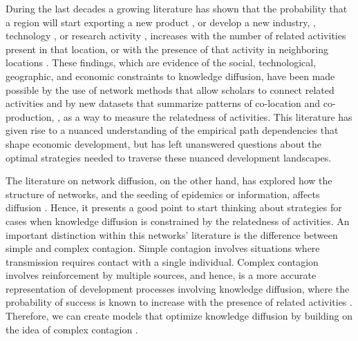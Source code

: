 \documentclass[preprint,superscriptaddress,floatfix]{article}
\begin{document}
During the last decades a growing literature has shown that the probability that a region will start exporting a new product \cite{hidalgo2007product,hausmann2014atlas}, or develop a new industry, \cite{neffke2011regions,zhu2017jump}, technology  \cite{petralia2017climbing}, or research activity \cite{boschma2015relatedness,guevara2016research}, increases with the number of related activities present in that location, or with the presence of that activity in neighboring locations \cite{bahar2014neighbors,boschma2015relatedness}. These findings, which are evidence of the social, technological, geographic, and economic constraints to knowledge diffusion, have been made possible by the use of network methods \cite{albert2002statistical} that allow scholars to connect related activities and by new datasets that summarize patterns of co-location  \cite{hidalgo2007product} and co-production, \cite{neffke2011regions,guevara2016research,petralia2017climbing}, as a way to measure the relatedness of activities. This literature has given rise to a nuanced understanding of the empirical path dependencies that shape economic development, but has left unanswered questions about the optimal strategies needed to traverse these nuanced development landscapes.  

The literature on network diffusion, on the other hand, has explored how the structure of networks, and the seeding of epidemics or information, affects diffusion \cite{domingos2001mining,pastor2001epidemic,christakis2007spread,aral2013engineering}. Hence, it presents a good point to start thinking about strategies for cases when knowledge diffusion is constrained by the relatedness of activities. An important distinction within this networks' literature is the difference between simple and complex contagion\cite{centola2007complex,centola2011experimental,centola2010spread}. Simple contagion involves situations where transmission requires contact with a single individual\cite{kermack1927contribution}. Complex contagion involves reinforcement by multiple sources\cite{centola2007complex,centola2011experimental, centola2010spread}, and hence, is a more accurate representation of development processes involving knowledge diffusion, where the probability of success is known to increase with the presence of related activities  \cite{hidalgo2007product,hausmann2014atlas,neffke2011regions,zhu2017jump,petralia2017climbing,boschma2015relatedness,bahar2014neighbors,guevara2016research}. Therefore, we can create models that optimize knowledge diffusion by building on the idea of complex contagion \cite{centola2007complex,centola2011experimental,centola2010spread}.
\end{document}
